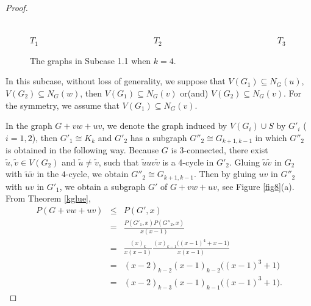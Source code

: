 \documentclass[12pt]{article}
\theoremstyle{definition}
\begin{document}
\begin{proof}
\begin{figure}[h!]
\begin{center}
\\$T_1$~~~~~~~~~~~~~~~~~~~~~~~~~~~$T_2$~~~~~~~~~~~~~~~~~~~~~~~~~~~$T_3$
\caption{The graphs in Subcase 1.1 when $k=4$.}
\label{fig5}
\end{center}
\end{figure}



In this subcase, without loss of generality, we suppose that $V(G_1)\subseteq N_{G}(u)$, $V(G_2)\subseteq N_{G}(w)$, then $V(G_1)\subseteq N_{G}(v)$ or(and) $V(G_2)\subseteq N_{G}(v)$. For the symmetry, we assume that $V(G_1)\subseteq N_{G}(v)$.

In the graph $G+vw+uv$, we denote the graph induced by $V(G_i)\cup S$ by $G'_i$ ($i=1,2$), then $G'_1\cong K_k$ and $G'_2$ has a subgraph
$G''_2\cong G_{k+1,k-1}$ in which $G''_2$ is obtained in the following way.
Because $G$ is $3$-connected, there exist $\tilde{u},\tilde{v}\in V(G_2)$ and $\tilde{u}\neq \tilde{v}$, such that $\tilde{u}uv\tilde{v}$ is a 4-cycle in $G'_2$.  Gluing
$\tilde{u}\tilde{v}$ in $G_2$ with $\tilde{u}\tilde{v}$ in the $4$-cycle, we obtain $G''_2\cong G_{k+1,k-1}$. Then by gluing
$uv$ in $G''_2$ with $uv$ in $G'_1$, we obtain a subgraph $G'$ of $G+vw+uv$, see Figure  \ref{fig8}(a). From Theorem \ref{kglue},
\begin{eqnarray}\label{AAA}P(G+vw+uv)&\leq &P(G',x)\nonumber\\
&=&\frac{P(G'_1,x)P(G''_2,x)}{x(x-1)}\nonumber\\
&=&\frac{(x)_{k}}{x(x-1)}\frac{(x)_{k-1}\big((x-1)^4+x-1\big)}{x(x-1)}\nonumber\\
&=&(x-2)_{k-2}(x-1)_{k-2}\big((x-1)^3+1\big)\nonumber\\
&=&(x-2)_{k-3}(x-1)_{k-1}\big((x-1)^3+1\big).
\end{eqnarray}


\end{proof}
\end{document}
